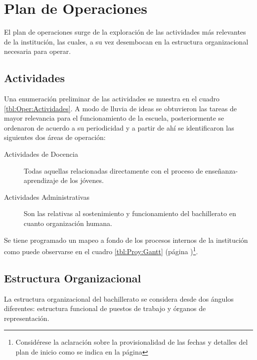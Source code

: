 





\clearpage

\section{Plan de Operaciones}

El plan de operaciones surge de la exploración de las actividades más relevantes de la institución, las cuales, a su vez desembocan en la estructura organizacional necesaria para operar.

\subsection{Actividades}

Una enumeración preliminar de las actividades se muestra en el cuadro \ref{tbl:Oper:Actividades}. A modo de lluvia de ideas se obtuvieron las tareas de mayor relevancia para el funcionamiento de la escuela, posteriormente se ordenaron de acuerdo a su periodicidad y a partir de ahí se identificaron las siguientes dos áreas de operación:

\begin{description}
	\item[Actividades de Docencia]
		Todas aquellas relacionadas directamente con el proceso de enseñanza-aprendizaje de los jóvenes.
	\item[Actividades Administrativas]
		Son las relativas al sostenimiento y funcionamiento del bachillerato en cuanto organización humana.
\end{description}

Se tiene programado un mapeo a fondo de los procesos internos de la institución como puede observarse en el cuadro \ref{tbl:Proy:Gantt} (página \pageref{tbl:Proy:Gantt})\footnote{Considérese la aclaración sobre la provisionalidad de las fechas y detalles del plan de inicio como se indica en la página \pageref{sec:Proy:Aclaracion}}.


\clearpage

\subsection{Estructura Organizacional}

La estructura organizacional del bachillerato se considera desde dos ángulos diferentes: estructura funcional de puestos de trabajo y órganos de representación.


